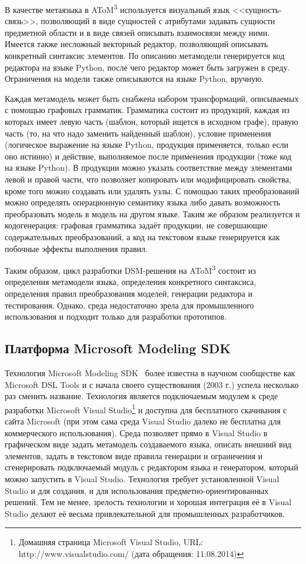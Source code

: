 В качестве метаязыка в AToM\textsuperscript{3} используется визуальный язык <<сущность-связь>>, позволяющий в виде 
сущностей с атрибутами задавать сущности предметной области и в виде связей описывать 
взаимосвязи между ними. Имеется также несложный векторный редактор, позволяющий описывать 
конкретный синтаксис элементов. По описанию метамодели генерируется код редактора 
на языке Python, после чего редактор может быть загружен в среду. Ограничения на модели
также описываются на языке Python, вручную.

Каждая метамодель может быть снабжена набором трансформаций, описываемых с помощью 
графовых грамматик. Грамматика состоит из продукций, каждая из которых имеет левую 
часть (шаблон, который ищется в исходном графе), правую часть (то, на что надо заменить 
найденный шаблон), условие применения (логическое выражение на языке Python, продукция 
применяется, только если оно истинно) и действие, выполняемое после применения продукции 
(тоже код на языке Python). В продукции можно указать соответствие между элементами 
левой и правой части, что позволяет копировать или модифицировать свойства, кроме 
того можно создавать или удалять узлы. С помощью таких преобразований можно определять 
операционную семантику языка либо давать возможность преобразовать модель в модель 
на другом языке. Таким же образом реализуется и кодогенерация: графовая грамматика 
задаёт продукции, не совершающие содержательных преобразований, а код на текстовом 
языке генерируется как побочные эффекты выполнения правил.

Таким образом, цикл разработки \ac{DSM}-решения на AToM\textsuperscript{3} состоит из определения метамодели 
языка, определения конкретного синтаксиса, определения правил преобразования моделей, 
генерации редактора и тестирования. Однако, среда недостаточно зрела для промышленного 
использования и подходит только для разработки прототипов.

\subsection{Платформа Microsoft Modeling SDK}
Технология Microsoft Modeling SDK~\cite{cook2007domain} более известна в научном сообществе как Microsoft DSL Tools
и с начала своего существования (2003 г.) успела несколько раз сменить название. Технология является
подключаемым модулем к среде разработки Microsoft Visual Studio\footnote
{Домашняя страница Microsoft Visual Studio, URL: http://www.visualstudio.com/ (дата обращения: 11.08.2014)}
и доступна для бесплатного скачивания с сайта Microsoft (при этом сама среда Visual Studio далеко не 
бесплатна для коммерческого использования). Среда позволяет прямо в Visual Studio
в графическом виде задать метамодель создаваемого языка, описать внешний вид элементов, 
задать в текстовом виде правила генерации и ограничения и сгенерировать подключаемый модуль с
редактором языка и генератором, который можно запустить в Visual Studio. Технология требует установленной 
Visual Studio и для создания, и для использования предметно-ориентированных решений.
Тем не менее, зрелость технологии и хорошая интеграция её в Visual Studio делают её
весьма привлекательной для промышленных разработчиков.

